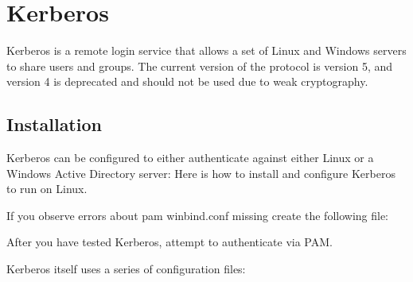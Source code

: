 \section{Kerberos}

Kerberos is a remote login service that allows a set of Linux and Windows servers to share users and groups.
The current version of the protocol is version 5, and version 4 is deprecated and should not be used due to weak cryptography.

\subsection{Installation}

Kerberos can be configured to either authenticate against either Linux or a Windows Active Directory server:
Here is how to install and configure Kerberos to run on Linux.

If you observe errors about pam winbind.conf missing create the following file:

After you have tested Kerberos, attempt to authenticate via PAM.

Kerberos itself uses a series of configuration files:

